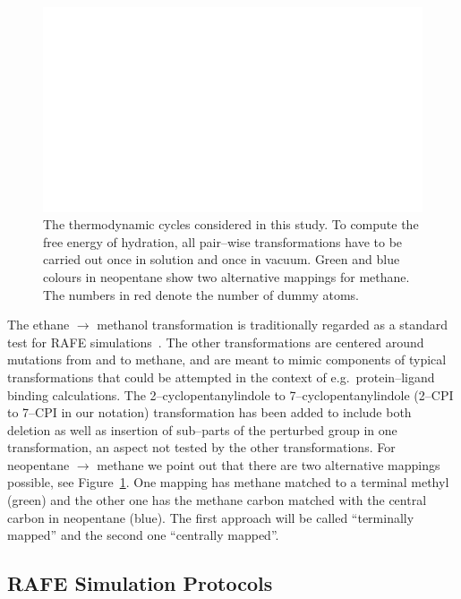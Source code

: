 \documentclass[journal=jctcce,manuscript=article]{achemso}
\begin{document}
\begin{figure}[ht]
  \includegraphics[scale=1.0]{figures/cycles.pdf}
  \caption{The thermodynamic cycles considered in this study.  To
    compute the free energy of hydration, all pair--wise
    transformations have to be carried out once in solution and once
    in vacuum.  Green and blue colours in neopentane show two
    alternative mappings for methane.  The numbers in red denote the
    number of dummy atoms.}
  \label{fig:cycles}
\end{figure}

The ethane $\rightarrow$ methanol transformation is traditionally
regarded as a standard test for RAFE
simulations~\cite{doi:10.1063/1.449208, doi:10.1021/jp981629f}.   The
other transformations are centered around mutations from and to
methane, and are meant to mimic components of typical transformations that could be attempted
in the context of e.g.\ protein--ligand binding calculations. The
2--cyclopentanylindole to 7--cyclopentanylindole (2--CPI to 7--CPI in our notation)
transformation has been added to include both deletion as well as
insertion of sub--parts of the perturbed group in one transformation, an aspect not tested by the other transformations.  For
neopentane $\rightarrow$ methane we point out that there are two
alternative mappings possible, see Figure~\ref{fig:cycles}.  One mapping has methane matched to a terminal methyl (green) and the other
one has the methane carbon matched with the central carbon in
neopentane (blue).  The first approach will be called ``terminally mapped'' and
the second one ``centrally mapped''.


\subsection{RAFE Simulation Protocols}
\label{sec:rafe_protocols}
\end{document}
